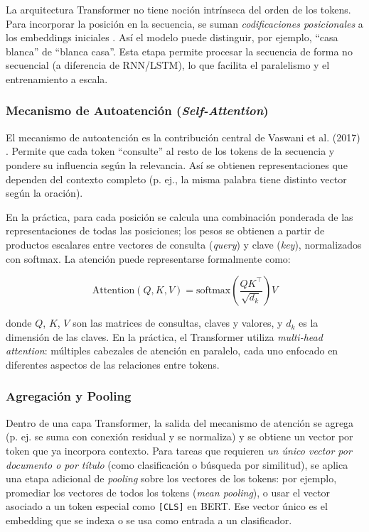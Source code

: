 \documentclass[11pt,a4paper]{article}
\begin{document}
La arquitectura Transformer no tiene noción intrínseca del orden de los tokens. Para incorporar la posición en la secuencia, se suman \emph{codificaciones posicionales} a los embeddings iniciales \cite{vaswani2017}. Así el modelo puede distinguir, por ejemplo, ``casa blanca'' de ``blanca casa''. Esta etapa permite procesar la secuencia de forma no secuencial (a diferencia de RNN/LSTM), lo que facilita el paralelismo y el entrenamiento a escala.

\subsubsection{Mecanismo de Autoatención (\textit{Self-Attention})}

El mecanismo de autoatención es la contribución central de Vaswani et al. (2017) \cite{vaswani2017}. Permite que cada token ``consulte'' al resto de los tokens de la secuencia y pondere su influencia según la relevancia. Así se obtienen representaciones que dependen del contexto completo (p. ej., la misma palabra tiene distinto vector según la oración).

En la práctica, para cada posición se calcula una combinación ponderada de las representaciones de todas las posiciones; los pesos se obtienen a partir de productos escalares entre vectores de consulta (\textit{query}) y clave (\textit{key}), normalizados con softmax. La atención puede representarse formalmente como:

\begin{equation}
\text{Attention}(Q, K, V) = \text{softmax}\left(\frac{QK^\top}{\sqrt{d_k}}\right) V
\end{equation}

donde $Q$, $K$, $V$ son las matrices de consultas, claves y valores, y $d_k$ es la dimensión de las claves. En la práctica, el Transformer utiliza \emph{multi-head attention}: múltiples cabezales de atención en paralelo, cada uno enfocado en diferentes aspectos de las relaciones entre tokens.

\subsubsection{Agregación y Pooling}

Dentro de una capa Transformer, la salida del mecanismo de atención se agrega (p. ej. se suma con conexión residual y se normaliza) y se obtiene un vector por token que ya incorpora contexto. Para tareas que requieren \emph{un único vector por documento o por título} (como clasificación o búsqueda por similitud), se aplica una etapa adicional de \emph{pooling} sobre los vectores de los tokens: por ejemplo, promediar los vectores de todos los tokens (\textit{mean pooling}), o usar el vector asociado a un token especial como \texttt{[CLS]} en BERT. Ese vector único es el embedding que se indexa o se usa como entrada a un clasificador.
\end{document}
